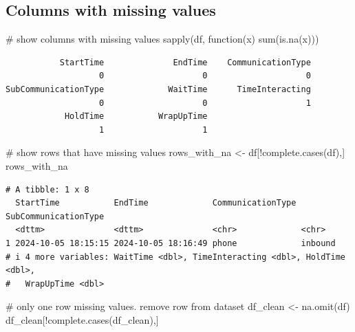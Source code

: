 \documentclass[
  letterpaper,
  DIV=11,
  numbers=noendperiod]{scrartcl}
\newenvironment{Shaded}{\begin{snugshade}}{\end{snugshade}}
\newcommand{\CommentTok}[1]{\textcolor[rgb]{0.37,0.37,0.37}{#1}}
\newcommand{\ControlFlowTok}[1]{\textcolor[rgb]{0.00,0.23,0.31}{#1}}
\newcommand{\FunctionTok}[1]{\textcolor[rgb]{0.28,0.35,0.67}{#1}}
\newcommand{\NormalTok}[1]{\textcolor[rgb]{0.00,0.23,0.31}{#1}}
\newcommand{\OtherTok}[1]{\textcolor[rgb]{0.00,0.23,0.31}{#1}}
\newcommand{\SpecialCharTok}[1]{\textcolor[rgb]{0.37,0.37,0.37}{#1}}
\begin{document}
\subsection{Columns with missing
values}\label{columns-with-missing-values}

\begin{Shaded}
\begin{Highlighting}[]
\CommentTok{\# show columns with missing values}
\FunctionTok{sapply}\NormalTok{(df, }\ControlFlowTok{function}\NormalTok{(x) }\FunctionTok{sum}\NormalTok{(}\FunctionTok{is.na}\NormalTok{(x)))}
\end{Highlighting}
\end{Shaded}

\begin{verbatim}
           StartTime              EndTime    CommunicationType 
                   0                    0                    0 
SubCommunicationType             WaitTime      TimeInteracting 
                   0                    0                    1 
            HoldTime           WrapUpTime 
                   1                    1 
\end{verbatim}

\begin{Shaded}
\begin{Highlighting}[]
\CommentTok{\# show rows that have missing values}
\NormalTok{rows\_with\_na }\OtherTok{\textless{}{-}}\NormalTok{ df[}\SpecialCharTok{!}\FunctionTok{complete.cases}\NormalTok{(df),]}
\NormalTok{rows\_with\_na}
\end{Highlighting}
\end{Shaded}

\begin{verbatim}
# A tibble: 1 x 8
  StartTime           EndTime             CommunicationType SubCommunicationType
  <dttm>              <dttm>              <chr>             <chr>               
1 2024-10-05 18:15:15 2024-10-05 18:16:49 phone             inbound             
# i 4 more variables: WaitTime <dbl>, TimeInteracting <dbl>, HoldTime <dbl>,
#   WrapUpTime <dbl>
\end{verbatim}

\begin{Shaded}
\begin{Highlighting}[]
\CommentTok{\# only one row missing values. remove row from dataset}
\NormalTok{df\_clean }\OtherTok{\textless{}{-}} \FunctionTok{na.omit}\NormalTok{(df)}
\NormalTok{df\_clean[}\SpecialCharTok{!}\FunctionTok{complete.cases}\NormalTok{(df\_clean),]}
\end{Highlighting}
\end{Shaded}
\end{document}

